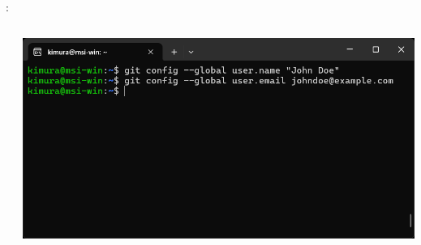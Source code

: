 \documentclass[aspectratio=169,dvipdfmx,cjk]{beamer}
\begin{document}
\begin{frame}{\insertsection \thesubsection: \insertsubsection}
\begin{columns}
\begin{column}{0.3\textwidth}
    \end{column}
    \begin{column}{0.35\textwidth}
      \includegraphics[width=1.0\linewidth]{fig/git-config.png}
    \end{column}
  \end{columns}
\end{frame}
\end{document}
